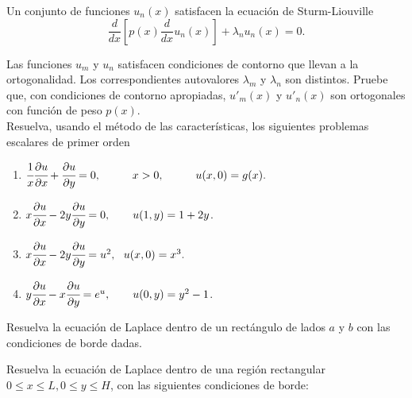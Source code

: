 \documentclass[11pt,spanish]{article}
\newcounter{problema}
\begin{document}
\prob{}
Un conjunto de funciones $u_n(x)$ satisfacen la ecuación de Sturm-Liouville
\[
 \frac{d}{dx}\left[ p(x) \frac{d}{dx} u_n(x) \right] + \lambda_n u_n(x) = 0.
\]

Las funciones $u_m$ y $u_n$ satisfacen condiciones de contorno que llevan a la 
ortogonalidad. Los correspondientes autovalores $\lambda_m$ y $\lambda_n$ son 
distintos. Pruebe que, con condiciones de contorno apropiadas, $u'_m(x)$ y 
$u'_n(x)$ son ortogonales con función de peso $p(x)$.\\


\prob{} Resuelva, usando el método de las características, los siguientes problemas escalares
de primer orden
\begin{enumerate}

\item $\cfrac{1}{x} \cfrac{\partial u}{\partial x} + \cfrac{\partial u}{\partial y}=0,  \hspace{1cm} x>0,  \hspace{1cm} u(x,0)=g(x).  
$
\item $ x\cfrac{\partial u}{\partial x} - 2y\cfrac{\partial u}{\partial y} = 0, \qquad u(1,y) = 1+2y$.

\item $x \cfrac{\partial u}{\partial x} - 2y \cfrac{\partial u}{\partial y}= u^2, \,\,\,\, u(x,0)=x^3.$

\item $y\cfrac{\partial u}{\partial x} - x\cfrac{\partial u}{\partial y} = e^u, \qquad u(0,y) = y^2-1$.

\end{enumerate}

\prob{} Resuelva la ecuación de Laplace dentro de un rect\'angulo de lados  $a$ y $b$ con las condiciones de borde dadas. 



\prob{}
Resuelva la ecuaci\'on de Laplace dentro de una regi\'on rectangular $0 \leq x \leq L, 0 \leq y \leq H$, con las siguientes condiciones de borde:
\end{document}
